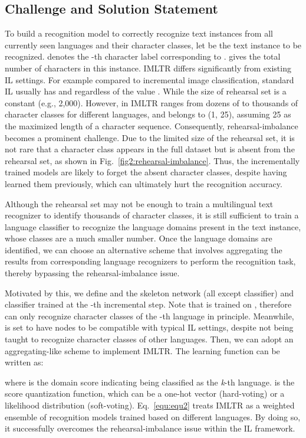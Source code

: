 \documentclass[10pt,twocolumn,letterpaper]{article}
\begin{document}
\subsection{Challenge and Solution Statement}

To build a recognition model to correctly recognize text instances from all currently seen languages and their character classes, let  be the text instance to be recognized.  denotes the -th character label corresponding to .  gives the total number of characters in this instance. 
IMLTR differs significantly from existing IL settings. For example compared to incremental image classification, standard IL usually has  and  regardless of the value . While the size of rehearsal set  is a constant (e.g., 2,000). However, in IMLTR  ranges from dozens of to thousands of character classes for different languages, and  belongs to (1, 25), assuming 25 as the maximized length of a character sequence.
Consequently, rehearsal-imbalance becomes a prominent challenge. Due to the limited size of the rehearsal set, it is not rare that a character class appears in the full dataset but is absent from the rehearsal set, as shown in Fig.~\ref{fig2:rehearsal-imbalance}. Thus, the incrementally trained models are likely to forget the absent character classes, despite having learned them previously, which can ultimately hurt the recognition accuracy.




Although the rehearsal set may not be enough to train a multilingual text recognizer to identify thousands of character classes, it is still sufficient to train a language classifier to recognize the language domains present in the text instance, whose classes are a much smaller number. Once the language domains are identified, we can choose an alternative scheme that involves aggregating the results from corresponding language recognizers to perform the recognition task, thereby bypassing the rehearsal-imbalance issue.

Motivated by this, we define  and  the skeleton network (all except classifier) and classifier trained at the -th incremental step. Note that  is trained on , therefore can only recognize character classes of the -th language in principle. Meanwhile,  is set to have  nodes to be compatible with typical IL settings, despite not being taught to recognize character classes of other languages. Then, we can adopt an aggregating-like scheme to implement IMLTR. The learning function can be written as:


where  is the domain score indicating  being classified as the \emph{k}-th language.  is the score quantization function, which can be a one-hot vector (hard-voting) or a likelihood distribution (soft-voting). Eq.~\ref{equ:equ2} treats IMLTR as a weighted ensemble of recognition models trained based on different languages. By doing so, it successfully overcomes the rehearsal-imbalance issue within the IL framework. 
\end{document}

